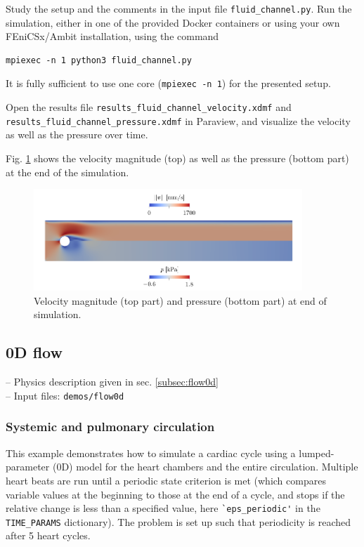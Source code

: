 \documentclass[a4paper,12pt]{report}
\begin{document}
Study the setup and the comments in the input file \verb"fluid_channel.py". Run the simulation, either in one of the provided Docker containers or using your own FEniCSx/Ambit installation, using the command

\begin{verbatim}
mpiexec -n 1 python3 fluid_channel.py
\end{verbatim}

It is fully sufficient to use one core (\verb"mpiexec -n 1") for the presented setup.

Open the results file \verb"results_fluid_channel_velocity.xdmf" and \\ \verb"results_fluid_channel_pressure.xdmf" in Paraview, and visualize the velocity as well as the pressure over time.

Fig. \ref{fig:channel_results} shows the velocity magnitude (top) as well as the pressure (bottom part) at the end of the simulation.

\begin{figure}[ht]
\centering
\includegraphics[width=0.9\textwidth]{fig/channel_results.png}
\caption{Velocity magnitude (top part) and pressure (bottom part) at end of simulation.}
\label{fig:channel_results}
\end{figure}


\subsection{0D flow}\label{subsec:demos:flow0d}

-- Physics description given in sec. \ref{subsec:flow0d}\\

-- Input files: \verb"demos/flow0d"

\subsubsection*{Systemic and pulmonary circulation}

This example demonstrates how to simulate a cardiac cycle using a lumped-parameter (0D) model for the heart chambers and the entire circulation. Multiple heart beats are run
until a periodic state criterion is met (which compares variable values at the beginning to those at the end of a cycle, and stops if the relative change is less than
a specified value, here \verb"`eps_periodic'" in the \verb"TIME_PARAMS" dictionary). The problem is set up such that periodicity is reached after 5 heart cycles.
\end{document}
